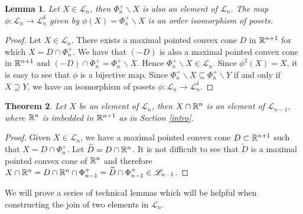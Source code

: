 \documentclass[psamsfonts]{amsart}
\numberwithin{equation}{subsection}
\theoremstyle{plain}
\newtheorem{theorem}{Theorem}[section]
\newtheorem{lemma}[theorem]{Lemma}
\theoremstyle{definition}
\theoremstyle{remark}
\begin{document}
\begin{lemma}\label{duality} Let 
 $X \in \mathcal{L}_n$, then $\Phi^+_n \backslash X$ is also an element of $\mathcal{L}_n$.  The map $\phi: \mathcal{L}_n \to \mathcal{L}_n^{\delta}$ given by 
$\phi(X) = \Phi^+_n \backslash X$ is an order  isomorphism of posets. 
\end{lemma}
\begin{proof} Let 
 $X \in \mathcal{L}_n$. 
 There exists a maximal pointed convex cone $D$  in $\Bbb{R}^{n + 1}$ for which $X = D \cap \Phi_n^+$. 
 We have that $(-D)$ is also a maximal pointed convex cone in $\Bbb{R}^{n + 1}$ and $(-D)\cap  \Phi_n^+ = \Phi_n^+ \backslash X$. 
 Hence $\Phi_n^+ \backslash X \in \mathcal{L}_n$. Since $\phi^2(X) = X$, it is easy to see that $\phi$ is a bijective map. 
 Since $ \Phi_n^+ \backslash X \subseteq  \Phi_n^+ \backslash Y$ if and only if $X \supseteq Y$, we have an isomorphism of posets 
$\phi: \mathcal{L}_n \to \mathcal{L}_n^{\delta}$. 
\end{proof}








\begin{theorem} \label{projection}
Let $X$ be an element of $\mathcal{L}_n$, then $X \cap \Bbb{R}^{n }$ is an 
element of $\mathcal{L}_{n - 1}$, where $\Bbb{R}^n $ is imbedded  in   $\Bbb{R}^{n + 1} $ as in Section \ref{intro}.
\end{theorem}

\begin{proof} Given $X \in \mathcal{L}_n$, 
we have a maximal pointed convex cone  $D \subset \Bbb{R}^{n + 1}$ such that $X = D \cap  \Phi_n^+$.  Let $\widetilde{D} = D  \cap  \Bbb{R}^{n }$. It is not difficult to see that $\widetilde{D}$ is a maximal pointed convex cone  of $\Bbb{R}^{n }$ and therefore $X \cap  \Bbb{R}^{n }  = D  \cap  \Bbb{R}^{n } \cap \Phi_{n - 1}^+  = \widetilde{D}  \cap \Phi_{n - 1}^+  \in \mathcal{L}_{n - 1}$. 
\end{proof}






We will prove a series of technical lemmas which will be helpful when constructing the join of two elements in $\mathcal{L}_n$.
\end{document}

